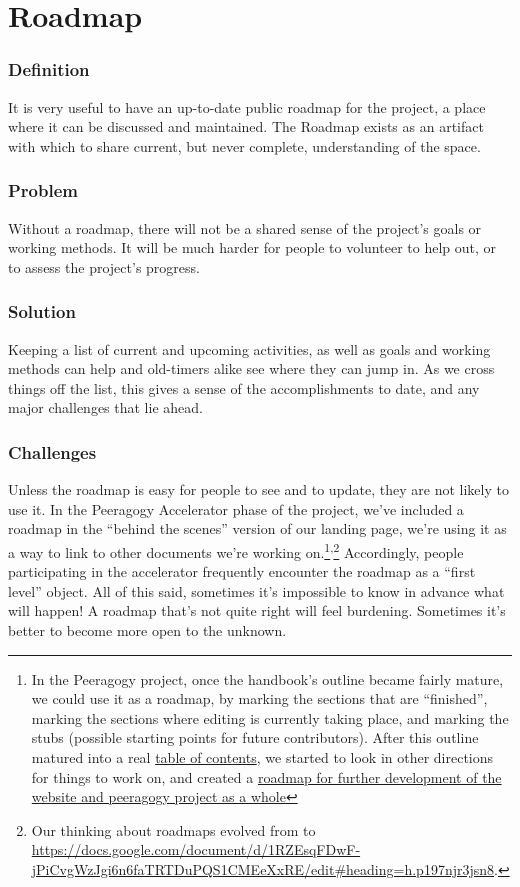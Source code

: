 \section{Roadmap} \label{sec:Roadmap}

\subsubsection*{Definition} It is very useful to have an up-to-date public
roadmap for the project, a place where it can be discussed and
maintained. The Roadmap exists as an artifact with which to share
current, but never complete, understanding of the space.

\subsubsection*{Problem} Without a roadmap, there will not be a shared sense of
the project's goals or working methods. It will be much harder for
people to volunteer to help out, or to assess the project's progress.

\subsubsection*{Solution} Keeping a list of current and upcoming activities, as
well as goals and working methods can
help 
and old-timers alike see where they can jump in. As we cross things off
the list, this gives a sense of the accomplishments to date, and any
major challenges that lie ahead.

\subsubsection*{Challenges} Unless the roadmap is easy for people to see and to
update, they are not likely to use it. In the Peeragogy Accelerator
phase of the project, we've included a roadmap in the ``behind the
scenes'' version of our landing page, we're using it as a way to link to
other documents we're working on.\footnote{In the Peeragogy project, once the handbook's outline became fairly
  mature, we could use it as a roadmap, by marking the sections that are
  ``finished'', marking the sections where editing is currently taking
  place, and marking the stubs (possible starting points for future
  contributors). After this outline matured into a
  real \href{http://peeragogy.org/table-of-contents/}{table of contents},
  we started to look in other directions for things to work on, and
  created a \href{http://peeragogy.org/peeragogy-org-roadmap/}{roadmap
  for further development of the website and peeragogy project as a
  whole}}\textsuperscript{,}\footnote{Our thinking about roadmaps evolved from \cite{corneli2013roadmaps} to \url{https://docs.google.com/document/d/1RZEsqFDwF-jPiCvgWzJgi6n6faTRTDuPQS1CMEeXxRE/edit\#heading=h.p197njr3jsn8}.} Accordingly, people participating in
the accelerator frequently encounter the roadmap as a ``first level''
object. All of this said, sometimes it's impossible to know in advance
what will happen! A roadmap that's not quite right will feel burdening.
Sometimes it's better to become more open to the unknown.

